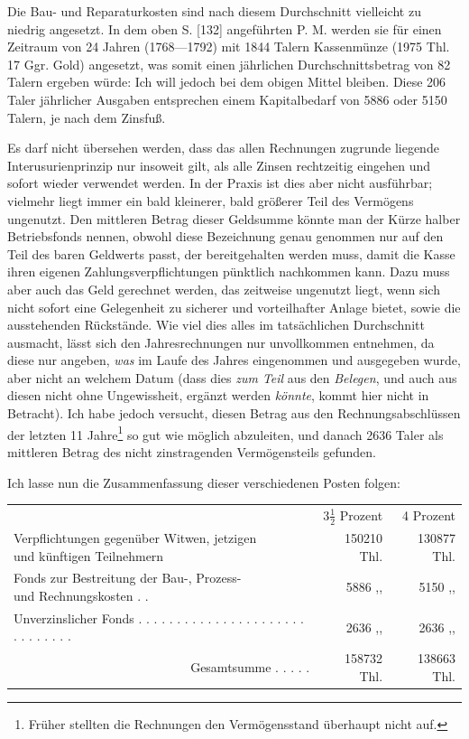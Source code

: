 \noindent\hspace*{\parindent}Die Bau- und Reparaturkosten sind nach diesem Durchschnitt vielleicht zu niedrig angesetzt. In dem oben S. [132] angeführten P. M. werden sie für einen Zeitraum von 24 Jahren (1768—1792) mit 1844 Talern Kassenmünze (1975 Thl. 17 Ggr. Gold) angesetzt, was somit einen jährlichen Durchschnittsbetrag von 82 Talern ergeben würde: Ich will jedoch bei dem obigen Mittel bleiben. Diese 206 Taler jährlicher Ausgaben entsprechen einem Kapitalbedarf von 5886 oder 5150 Talern, je nach dem Zinsfuß.

Es darf nicht übersehen werden, dass das allen Rechnungen zugrunde liegende Interusurienprinzip nur insoweit gilt, als alle Zinsen rechtzeitig eingehen und sofort wieder verwendet werden. In der Praxis ist dies aber nicht ausführbar; vielmehr liegt immer ein bald kleinerer, bald größerer Teil des Vermögens ungenutzt. Den mittleren Betrag dieser Geldsumme könnte man der Kürze halber Betriebsfonds nennen, obwohl diese Bezeichnung genau genommen nur auf den Teil des baren Geldwerts passt, der bereitgehalten werden muss, damit die Kasse ihren eigenen Zahlungsverpflichtungen pünktlich nachkommen kann. Dazu muss aber auch das Geld gerechnet werden, das zeitweise ungenutzt liegt, wenn sich nicht sofort eine Gelegenheit zu sicherer und vorteilhafter Anlage bietet, sowie die ausstehenden Rückstände. Wie viel dies alles im tatsächlichen Durchschnitt ausmacht, lässt sich den Jahresrechnungen nur unvollkommen entnehmen, da diese nur angeben, \textit{was} im Laufe des Jahres eingenommen und ausgegeben wurde, aber nicht an welchem Datum (dass dies \textit{zum Teil} aus den \textit{Belegen}, und auch aus diesen nicht ohne Ungewissheit, ergänzt werden \textit{könnte}, kommt hier nicht in Betracht). Ich habe jedoch versucht, diesen Betrag aus den Rechnungsabschlüssen der letzten 11 Jahre\footnote{Früher stellten die Rechnungen den Vermögensstand überhaupt nicht auf.} so gut wie möglich abzuleiten, und danach 2636 Taler als mittleren Betrag des nicht zinstragenden Vermögensteils gefunden.

Ich lasse nun die Zusammenfassung dieser verschiedenen Posten folgen:
\begin{center}
\fontsize{8}{9.6}\selectfont\setlength{\tabcolsep}{3pt}
\begin{tabular}{l r|r}
&\(3\tfrac{1}{2}\) Prozent&4 Prozent\\
\shortstack[l]{Verpflichtungen gegenüber Witwen, jetzigen\\und künftigen Teilnehmern}&150210 Thl.&130877 Thl.\\
\shortstack[l]{Fonds zur Bestreitung der Bau-, Prozess-\\und Rechnungskosten . .}&5886 ,, &5150 ,, \\
Unverzinslicher Fonds . . . . . . . . . . . . . . . . . . . . . . . . . . . . . .&2636 ,, &2636 ,, \\\cline{2-3}
\multicolumn{1}{r}{Gesamtsumme . . . . .}&158732 Thl.&138663 Thl.
\end{tabular}
\end{center}


